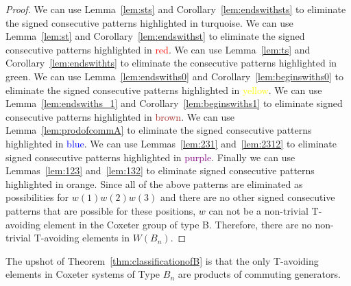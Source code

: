 \begin{theorem}
\begin{proof}
We can use Lemma~\ref{lem:sts} and Corollary~\ref{lem:endswithsts} to eliminate the signed consecutive patterns highlighted in \textcolor{turq}{turquoise}. We can use Lemma~\ref{lem:st} and Corollary~\ref{lem:endswithst} to eliminate the signed consecutive patterns highlighted in \textcolor{red}{red}. We can use Lemma~\ref{lem:ts} and Corollary~\ref{lem:endswithts} to eliminate the consecutive patterns highlighted in \textcolor{ggreen}{green}.  We can use Lemma~\ref{lem:endswiths0} and Corollary~\ref{lem:beginswiths0} to eliminate the signed consecutive patterns highlighted in \textcolor{yellow}{yellow}. We can use Lemma~\ref{lem:endswiths_1} and Corollary~\ref{lem:beginswiths1} to eliminate signed consecutive patterns highlighted in \textcolor{brown}{brown}. We can use Lemma~\ref{lem:prodofcommA} to eliminate the signed consecutive patterns highlighted in \textcolor{blue}{blue}. We can use Lemmas~\ref{lem:231} and~\ref{lem:2312} to eliminate signed consecutive patterns highlighted in \textcolor{purple}{purple}. Finally we can use Lemmas~\ref{lem:123} and~\ref{lem:132} to eliminate signed consecutive patterns highlighted in \textcolor{orange2}{orange}. Since all of the above patterns are eliminated as possibilities for $w(1)w(2)w(3)$ and there are no other signed consecutive patterns that are possible for these positions, $w$ can not be a non-trivial T-avoiding element in the Coxeter group of type B. Therefore, there are no non-trivial T-avoiding elements in $W(B_n)$.
\end{proof}
\end{theorem}


The upshot of Theorem~\ref{thm:classificationofB} is that the only T-avoiding elements in Coxeter systems of Type $B_n$ are products of commuting generators.
